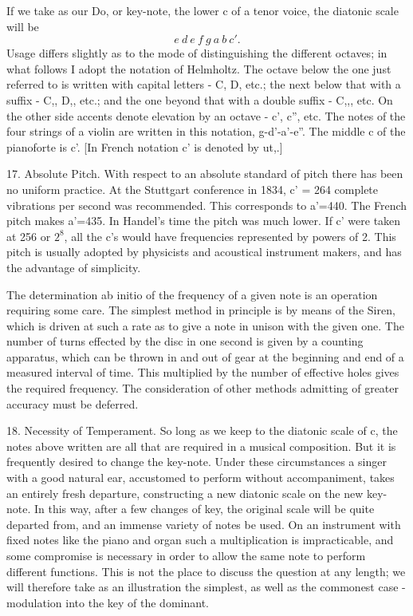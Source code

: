 If we take as our Do, or key-note, the lower c of a tenor voice, the diatonic
scale will be
\[ e~d~e~f~g~a~b~c'.\]
Usage differs slightly as to the mode of
distinguishing the different octaves; in what follows I adopt the notation of
Helmholtz. The octave below the one just referred to is written with capital
letters - C, D, etc.; the next below that with a suffix - C,, D,, etc.; and the
one beyond that with a double suffix - C,,, etc. On the other side accents
denote elevation by an octave - c', c'', etc. The notes of the four strings of
a violin are written in this notation, g-d'-a'-e''. The middle c of the
pianoforte is c'.  [In French notation c' is denoted by ut,.]

17.  Absolute Pitch.  With respect to an absolute standard of pitch there has
been no uniform practice. At the Stuttgart conference in 1834, c' = 264
complete vibrations per second was recommended. This corresponds to a'=440. The
French pitch makes a'=435. In Handel's time the pitch was much lower. If c'
were taken at 256 or \(2^8\), all the c's would have frequencies represented by
powers of 2. This pitch is usually adopted by physicists and acoustical
instrument makers, and has the advantage of simplicity.

The determination ab initio of the frequency of a given note is an operation
requiring some care. The simplest method in principle is by means of the Siren,
which is driven at such a rate as to give a note in unison with the given one.
The number of turns effected by the disc in one second is given by a counting
apparatus, which can be thrown in and out of gear at the beginning and end of a
measured interval of time.  This multiplied by the number of effective holes
gives the required frequency. The consideration of other methods admitting of
greater accuracy must be deferred.

18.  Necessity of Temperament.  So long as we keep to the diatonic scale of c,
the notes above written are all that are required in a musical composition. But
it is frequently desired to change the key-note. Under these circumstances a
singer with a good natural ear, accustomed to perform without accompaniment,
takes an entirely fresh departure, constructing a new diatonic scale on the new
key-note. In this way, after a few changes of key, the original scale will be
quite departed from, and an immense variety of notes be used. On an instrument
with fixed notes like the piano and organ such a multiplication is
impracticable, and some compromise is necessary in order to allow the same note
to perform different functions. This is not the place to discuss the question
at any length; we will therefore take as an illustration the simplest, as well
as the commonest case - modulation into the key of the dominant.

